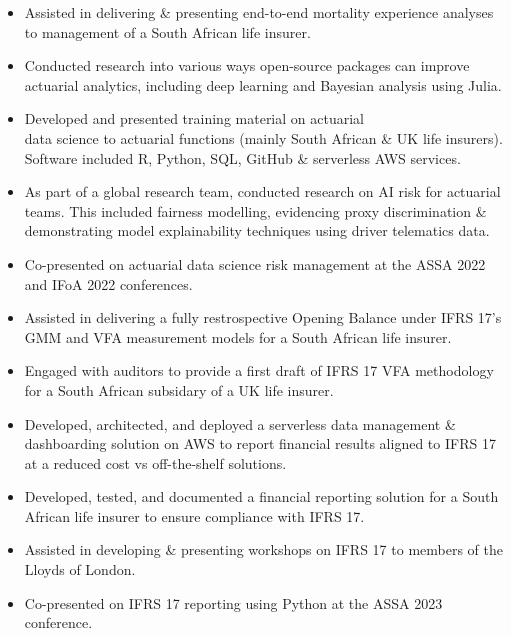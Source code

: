 \documentclass[10pt,a4paper,ragged2e,withhyper]{altacv}
\begin{document}
\begin{paracol}{2}
  \smallskip
  \smallskip
  \begin{itemize}[label=$\circ$, leftmargin=0.9cm, labelsep=0.43cm]
    \item Assisted in delivering \& presenting end-to-end mortality experience analyses to management of a South African life insurer.
    \item Conducted research into various ways open-source packages can improve \\actuarial analytics, including deep learning and Bayesian analysis using Julia.
    \item Developed and presented training material on actuarial \\data science to actuarial functions (mainly South African \& UK life insurers). Software included R, Python, SQL, GitHub \& serverless AWS services. 
    \item As part of a global research team, conducted research on AI risk for actuarial teams. This included fairness modelling, evidencing proxy discrimination \& demonstrating model explainability techniques using driver telematics data. 
    \item Co-presented on actuarial data science risk management at the ASSA 2022 and IFoA 2022 conferences. 
  \end{itemize}

  \begin{itemize}[label=$\circ$, leftmargin=0.9cm, labelsep=0.43cm]
    \item Assisted in delivering a fully restrospective Opening Balance under IFRS 17's GMM and VFA measurement models for a South African life insurer. 
    \item Engaged with auditors to provide a first draft of IFRS 17 VFA methodology for a South African subsidary of a UK life insurer. 
    \item Developed, architected, and deployed a serverless data management \&\\ dashboarding solution on AWS to report financial results aligned to IFRS 17 at a reduced cost vs off-the-shelf solutions.
    \item Developed, tested, and documented a financial reporting solution for a South African life insurer to ensure compliance with IFRS 17.
    \item Assisted in developing \& presenting workshops on IFRS 17 to members of the Lloyds of London. 
    \item Co-presented on IFRS 17 reporting using Python at the ASSA 2023 \\conference. 
  \end{itemize}


\end{paracol}
\end{document}

